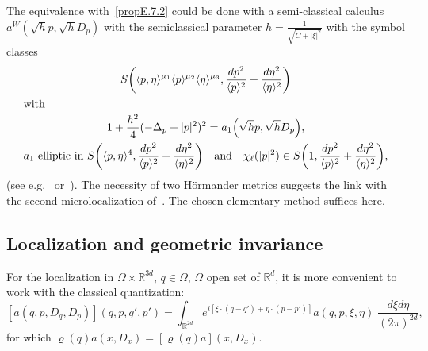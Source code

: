 \documentclass[AHL,Unicode,longabstracts]{cedram}
\newcommand{\R}{\mathbb{R}}
\let\originalleft\left
\let\originalright\right
\renewcommand{\left}{\mathopen{}\mathclose\bgroup\originalleft}
\renewcommand{\right}{\aftergroup\egroup\originalright}
\begin{document}
\begin{rema}\label{re:2ndmicro}
The equivalence with~\eqref{propE.7.2} could be done with a semi-classical calculus $a^{W}(\sqrt{h}p,\sqrt{h}D_{p})$ with the semiclassical parameter $h=\frac{1}{\sqrt{C+|\xi|^{2}}}$ with the symbol classes 
\begin{gather*}
S\left(\langle p,\eta\rangle^{\mu_{1}}\langle p\rangle^{\mu_{2}}\langle \eta\rangle^{\mu_{3}},\frac{dp^{2}}{\langle p\rangle^{2}}+\frac{d\eta^{2}}{\langle \eta\rangle^{2}}\right)\\
\intertext{with} 1+\frac{h^{2}}{4}(-\Delta_{p}+|p|^{2})^{2}=a_{1}\left(\sqrt{h}p,\sqrt{h}D_{p}\right),\\
a_{1}\text{ elliptic in } S\left(\langle p,\eta\rangle^{4},\frac{dp^{2}}{\langle p\rangle^{2}}+\frac{d\eta^{2}}{\langle \eta\rangle^{2}}\right) \quad\text{and}\quad \chi_{\ell}(|p|^{2})\in S\left(1,\frac{dp^{2}}{\langle p\rangle^{2}}+\frac{d\eta^{2}}{\langle \eta\rangle^{2}}\right),
\end{gather*}
(see e.g.~\cite{Rob} or~\cite{NaNi}). The necessity of two H\"ormander metrics suggests the link with the second microlocalization of~\cite{BoLe}. The chosen elementary method suffices here.
\end{rema}

\subsection{Localization and geometric invariance}\label{sec:geominv}

For the localization in $\Omega\times \R^{3d}$, $q\in \Omega$, $\Omega$ open set of $\R^{d}$, it is more convenient to work with the classical quantization:
\[
[a(q,p,D_{q},D_{p})](q,p,q',p')=\int_{\R^{2d}}e^{i[\xi\cdot(q-q')+\eta\cdot(p-p')]}a(q,p,\xi,\eta)\;\frac{d\xi d\eta}{(2\pi)^{2d}},
\]
for which $\varrho(q)a(x,D_{x})=[\varrho(q)a](x,D_{x})$.
\end{document}
